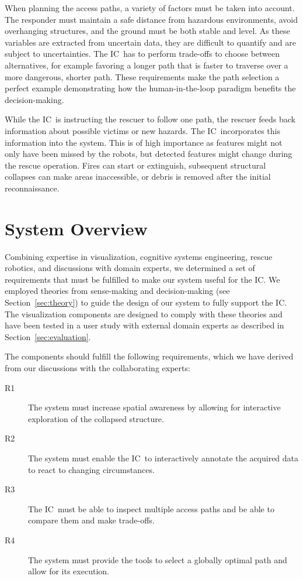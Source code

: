 \documentclass{egpubl}
\def\IC{IC}
\begin{document}
When planning the access paths, a variety of factors must be taken into account. The responder must maintain a safe distance from hazardous environments, avoid overhanging structures, and the ground must be both stable and level. As these variables are extracted from uncertain data, they are difficult to quantify and are subject to uncertainties. The \IC\ has to perform trade-offs to choose between alternatives, for example favoring a longer path that is faster to traverse over a more dangerous, shorter path. These requirements make the path selection a perfect example demonstrating how the human-in-the-loop paradigm benefits the decision-making.

While the \IC\ is instructing the rescuer to follow one path, the rescuer feeds back information about possible victims or new hazards. The \IC\ incorporates this information into the system. This is of high importance as features might not only have been missed by the robots, but detected features might change during the rescue operation. Fires can start or extinguish, subsequent structural collapses can make areas inaccessible, or debris is removed after the initial reconnaissance.


\section{System Overview} \label{sec:overview}

Combining expertise in visualization, cognitive systems engineering, rescue robotics, and discussions with domain experts, we determined a set of requirements that must be fulfilled to make our system useful for the \IC. We employed theories from sense-making and decision-making (see Section~\ref{sec:theory}) to guide the design of our system to fully support the \IC. The visualization components are designed to comply with these theories and have been tested in a user study with external domain experts as described in Section~\ref{sec:evaluation}.

The components should fulfill the following requirements, which we have derived from our discussions with the collaborating experts:

\begin{description}
\item[R1] The system must increase spatial awareness by allowing for interactive exploration of the collapsed structure.
\item[R2] The system must enable the \IC\ to interactively annotate the acquired data to react to changing circumstances.
\item[R3] The \IC\ must be able to inspect multiple access paths and be able to compare them and make trade-offs.
\item[R4] The system must provide the tools to select a globally optimal path and allow for its execution.
\end{description}
\end{document}
